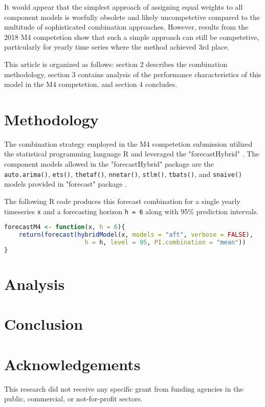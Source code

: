 \documentclass[11pt,3p,review,authoryear]{elsarticle}
\begin{document}
It would appear that the simplest approach of assigning equal weights to all component models is woefully obsolete and likely uncompetetive compared to the multitude of sophisticated combination approaches. However, results from the 2018 M4 competetion show that such a simple approach can still be competetive, particularly for yearly time series where the method achieved 3rd place.

This article is organized as follows: section 2 describes the combination methodology, section 3 contains analysis of the performance characteristics of this model in the M4 competetion, and section 4 concludes.

\section{Methodology}
The combination strategy employed in the M4 competetion submission utilized the statistical programming language R \citep{Rlang} and leveraged the "forecastHybrid" \citep{forecastHybrid}. The component models allowed in the "forecastHybrid" package are the  \lstinline{auto.arima()}, \lstinline{ets()}, \lstinline{thetaf()}, \lstinline{nnetar()}, \lstinline{stlm()}, \lstinline{tbats()}, and \lstinline{snaive()} models provided in "forecast" package \citep{Forecast}.


The following R code produces this forecast combination for a single yearly timeseries \lstinline{x} and a forecasting horizon \lstinline{h = 6} along with 95\% prediction intervals.
\begin{lstlisting}[language=R]
forecastM4 <- function(x, h = 6){
    return(forecast(hybridModel(x, models = "aft", verbose = FALSE),
                      h = h, level = 95, PI.combination = "mean"))
}
\end{lstlisting}

\section{Analysis}

\section{Conclusion}

\section*{Acknowledgements}

This research did not receive any specific grant from funding agencies in the public, commercial, or not-for-profit sectors.



\end{document}
